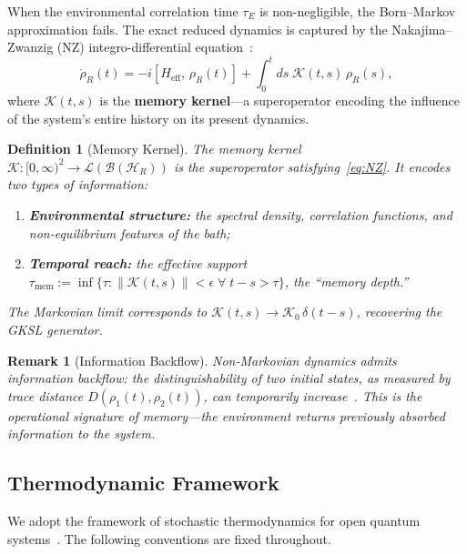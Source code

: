 \documentclass[12pt]{article}
\newtheorem{definition}[theorem]{Definition}
\newtheorem{remark}[theorem]{Remark}
\begin{document}
When the environmental correlation time $\tau_E$ is non-negligible,
the Born--Markov approximation fails. The exact reduced dynamics
is captured by the Nakajima--Zwanzig (NZ) integro-differential
equation~\cite{Nakajima1958,Zwanzig1960}:
\begin{equation}
\label{eq:NZ}
\dot{\rho}_R(t)
= -i[H_{\mathrm{eff}},\, \rho_R(t)]
  + \int_0^t ds\; \mathcal{K}(t,s)\, \rho_R(s),
\end{equation}
where $\mathcal{K}(t,s)$ is the \textbf{memory kernel}---a
superoperator encoding the influence of the system's entire
history on its present dynamics.

\begin{definition}[Memory Kernel]
\label{def:kernel}
The memory kernel $\mathcal{K}: [0,\infty)^2 \to
\mathcal{L}(\mathcal{B}(\mathcal{H}_R))$ is the superoperator
satisfying~\eqref{eq:NZ}. It encodes two types of information:
\begin{enumerate}
\item \textbf{Environmental structure:} the spectral density,
  correlation functions, and non-equilibrium features of the bath;
\item \textbf{Temporal reach:} the effective support
  $\tau_{\mathrm{mem}} := \inf\{\tau : \|\mathcal{K}(t,s)\| < \epsilon
  \;\forall\; t - s > \tau\}$, the ``memory depth.''
\end{enumerate}
The Markovian limit corresponds to
$\mathcal{K}(t,s) \to \mathcal{K}_0\, \delta(t-s)$,
recovering the GKSL generator.
\end{definition}

\begin{remark}[Information Backflow]
\label{rem:backflow}
Non-Markovian dynamics admits \emph{information backflow}:
the distinguishability of two initial states, as measured by
trace distance $D(\rho_1(t), \rho_2(t))$, can temporarily
increase~\cite{BreuerLainePiilo2009}. This is the operational
signature of memory---the environment returns previously
absorbed information to the system.
\end{remark}

\subsection{Thermodynamic Framework}
\label{subsec:thermo}

We adopt the framework of stochastic thermodynamics for open
quantum systems~\cite{EspositoLindenbergVandenBroeck2010}.
The following conventions are fixed throughout.
\end{document}
